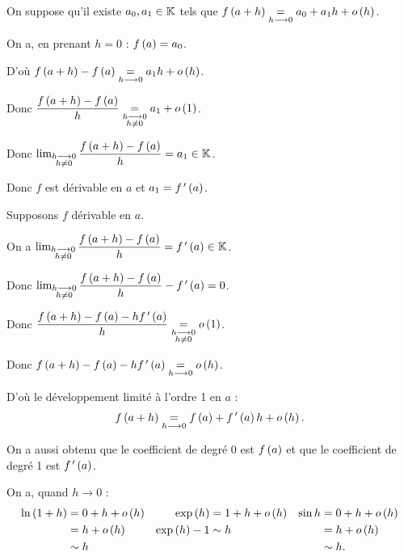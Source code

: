 \begin{dem}[2]
\impdir

On suppose qu'il existe \(a_0,a_1\in\mathbb{K}\) tels que \(f\left(a+h\right)\underset{h\longrightarrow0}{=}a_0+a_1h+o\left(h\right)\).

On a, en prenant \(h=0\) : \(f\left(a\right)=a_0\).

D'où \(f\left(a+h\right)-f\left(a\right)\underset{h\longrightarrow0}{=}a_1h+o\left(h\right)\).

Donc \(\dfrac{f\left(a+h\right)-f\left(a\right)}{h}\underset{\substack{h\longrightarrow0 \\ h\not=0}}{=}a_1+o\left(1\right)\).

Donc \(\lim_{\substack{h\longrightarrow0 \\ h\not=0}}\dfrac{f\left(a+h\right)-f\left(a\right)}{h}=a_1\in\mathbb{K}\).

Donc \(f\) est dérivable en \(a\) et \(a_1=f^{\,\prime}\left(a\right)\).

\imprec

Supposons \(f\) dérivable en \(a\).

On a \(\lim_{\substack{h\longrightarrow0 \\ h\not=0}}\dfrac{f\left(a+h\right)-f\left(a\right)}{h}=f^{\,\prime}\left(a\right)\in\mathbb{K}\).

Donc \(\lim_{\substack{h\longrightarrow0 \\ h\not=0}}\dfrac{f\left(a+h\right)-f\left(a\right)}{h}-f^{\,\prime}\left(a\right)=0\).

Donc \(\dfrac{f\left(a+h\right)-f\left(a\right)-hf^{\,\prime}\left(a\right)}{h}\underset{\substack{h\longrightarrow0 \\ h\not=0}}{=}o\left(1\right)\).

Donc \(f\left(a+h\right)-f\left(a\right)-hf^{\,\prime}\left(a\right)\underset{h\longrightarrow0}{=}o\left(h\right)\).

D'où le développement limité à l'ordre 1 en \(a\) : \[f\left(a+h\right)\underset{h\longrightarrow0}{=}f\left(a\right)+f^{\,\prime}\left(a\right)h+o\left(h\right).\]
\end{dem}

\begin{rem}
On a aussi obtenu que le coefficient de degré 0 est \(f\left(a\right)\) et que le coefficient de degré 1 est \(f^{\,\prime}\left(a\right)\).
\end{rem}

\begin{ex}
On a, quand \(h\to0\) : \begin{align*}
\ln\left(1+h\right)&=0+h+o\left(h\right) & \exp\left(h\right)&=1+h+o\left(h\right) & \sin h&=0+h+o\left(h\right) \\
&=h+o\left(h\right) & \exp\left(h\right)-1&\sim h & &=h+o\left(h\right) \\
&\sim h & & & &\sim h.
\end{align*}
\end{ex}

